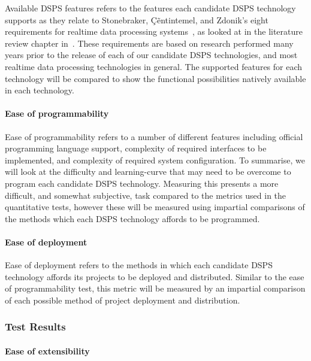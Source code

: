 Available DSPS features refers to the features each candidate DSPS technology supports as they relate to Stonebraker,
\c{C}\~entintemel, and Zdonik's eight requirements for realtime data processing systems~\cite{stonebraker_8_2005}, as looked at
in the literature review chapter in~. These requirements are based on research performed
many years prior to the release of each of our candidate DSPS technologies, and most realtime data processing technologies
in general. The supported features for each technology will be compared to show the functional possibilities natively
available in each technology.

\paragraph{Ease of programmability}

Ease of programmability refers to a number of different features including official programming language support, complexity
of required interfaces to be implemented, and complexity of required system configuration. To summarise, we will look at
the difficulty and learning-curve that may need to be overcome to program each candidate DSPS technology. Measuring this
presents a more difficult, and somewhat subjective, task compared to the metrics used in the quantitative tests, however
these will be measured using impartial comparisons of the methods which each DSPS technology affords to be programmed.

\paragraph{Ease of deployment}

Ease of deployment refers to the methods in which each candidate DSPS technology affords its projects to be deployed and distributed.
Similar to the ease of programmability test, this metric will be measured by an impartial comparison of each possible
method of project deployment and distribution.



\subsubsection{Test Results} %
\label{ssub:qual_test_results}

\paragraph{Ease of extensibility}

